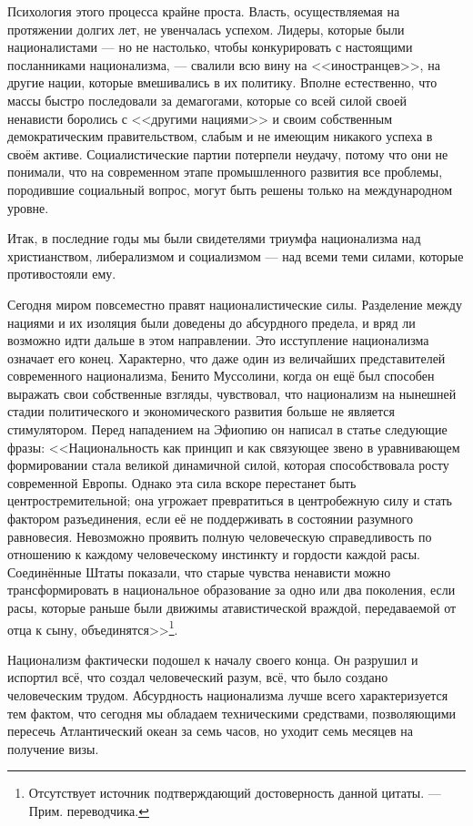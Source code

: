 Психология этого процесса крайне проста. Власть, осуществляемая на протяжении долгих лет, не увенчалась успехом. Лидеры, которые были националистами — но не настолько, чтобы конкурировать с настоящими посланниками национализма, — свалили всю вину на <<иностранцев>>, на другие нации, которые вмешивались в их политику. Вполне естественно, что массы быстро последовали за демагогами, которые со всей силой своей ненависти боролись с <<другими нациями>> и своим собственным демократическим правительством, слабым и не имеющим никакого успеха в своём активе. Социалистические партии потерпели неудачу, потому что они не понимали, что на современном этапе промышленного развития все проблемы, породившие социальный вопрос, могут быть решены только на международном уровне.

Итак, в последние годы мы были свидетелями триумфа национализма над христианством, либерализмом и социализмом — над всеми теми силами, которые противостояли ему.

Сегодня миром повсеместно правят националистические силы. Разделение между нациями и их изоляция были доведены до абсурдного предела, и вряд ли возможно идти дальше в этом направлении. Это исступление национализма означает его конец. Характерно, что даже один из величайших представителей современного национализма, Бенито Муссолини, когда он ещё был способен выражать свои собственные взгляды, чувствовал, что национализм на нынешней стадии политического и экономического развития больше не является стимулятором. Перед нападением на Эфиопию он написал в статье следующие фразы: <<Национальность как принцип и как связующее звено в уравнивающем формировании стала великой динамичной силой, которая способствовала росту современной Европы. Однако эта сила вскоре перестанет быть центростремительной; она угрожает превратиться в центробежную силу и стать фактором разъединения, если её не поддерживать в состоянии разумного равновесия. Невозможно проявить полную человеческую справедливость по отношению к каждому человеческому инстинкту и гордости каждой расы. Соединённые Штаты показали, что старые чувства ненависти можно трансформировать в национальное образование за одно или два поколения, если расы, которые раньше были движимы атавистической враждой, передаваемой от отца к сыну, объединятся>>\footnote{%
Отсутствует источник подтверждающий достоверность данной цитаты. — Прим. переводчика.}.

Национализм фактически подошел к началу своего конца. Он разрушил и испортил всё, что создал человеческий разум, всё, что было создано человеческим трудом. Абсурдность национализма лучше всего характеризуется тем фактом, что сегодня мы обладаем техническими средствами, позволяющими пересечь Атлантический океан за семь часов, но уходит семь месяцев на получение визы.

